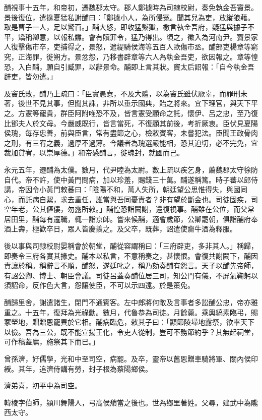 \begin{pinyinscope}
酺視事十五年，和帝初，遷魏郡太守。郡人鄭據時為司隸校尉，奏免執金吾竇景。景後復位，遣掾夏猛私謝酺曰：「鄭據小人，為所侵冤。聞其兒為吏，放縱狼藉。取是曹子一人，足以驚百。」酺大怒，即收猛繫獄，檄言執金吾府，疑猛與據子不平，矯稱卿意，以報私讎。會有贖罪令，猛乃得出。頃之，徵入為河南尹。竇景家人復擊傷市卒，吏捕得之，景怒，遣緹騎侯海等五百人歐傷市丞。酺部吏楊章等窮究，正海罪，徙朔方。景忿怨，乃移書辟章等六人為執金吾吏，欲因報之。章等惶恐，入白酺，願自引臧罪，以辭景命。酺即上言其狀。竇太后詔報：「自今執金吾辟吏，皆勿遣。」

及竇氏敗，酺乃上疏曰：「臣實愚惷，不及大體，以為竇氏雖伏厥辜，而罪刑未著，後世不見其事，但聞其誅，非所以垂示國典，貽之將來。宜下理官，與天下平之。方憲等寵貴，群臣阿附唯恐不及，皆言憲受顧命之託，懷伊、呂之忠，至乃復比鄧夫人於文母。今嚴威既行，皆言當死，不復顧其前後，考折厥衷。臣伏見夏陽侯瑰，每存忠善，前與臣言，常有盡節之心，檢敕賓客，未嘗犯法。臣聞王政骨肉之刑，有三宥之義，過厚不過薄。今議者為瑰選嚴能相，恐其迫切，必不完免，宜裁加貸宥，以崇厚德。」和帝感酺言，徙瑰封，就國而己。

永元五年，遷酺為太僕。數月，代尹睦為太尉。數上疏以疾乞身，薦魏郡太守徐防自代。帝不許，使中黃門問病，加以珍羞，賜錢三十萬。酺遂稱篤。時子蕃以郎侍講，帝因令小黃門敕蕃曰：「陰陽不和，萬人失所，朝廷望公思惟得失，與國同心，而託病自絜，求去重任，誰當與吾同憂責者？非有望於斷金也。司徒固疾，司空年老，公其傴僂，勿露所敕。」酺惶恐詣闕謝，還復視事。酺雖在公位，而父常居田里，酺每有遷職，輒一詣京師。嘗來候酺，適會歲節，公卿罷朝，俱詣酺府奉酒上壽，極歡卒日，眾人皆慶羨之。及父卒，既葬，詔遣使齎牛酒為釋服。

後以事與司隸校尉晏稱會於朝堂，酺從容謂稱曰：「三府辟吏，多非其人。」稱歸，即奏令三府各實其掾史。酺本以私言，不意稱奏之，甚懷恨。會復共謝闕下，酺因責讓於稱。稱辭言不順，酺怒，遂廷叱之，稱乃劾奏酺有怨言。天子以酺先帝師，有詔公卿、博士、朝臣會議。司徒呂蓋奏酺位居三司，知公門有儀，不屏氣鞠躬以須詔命，反作色大言，怨讓使臣，不可以示四遠。於是策免。

酺歸里舍，謝遣諸生，閉門不通賓客。左中郎將何敞及言事者多訟酺公忠，帝亦雅重之。十五年，復拜為光祿勳。數月，代魯恭為司徒。月餘薨。乘輿縞素臨弔，賜冢塋地，賵贈恩寵異於它相。酺病臨危，敕其子曰：「顯節陵埽地露祭，欲率天下以儉。吾為三公，既不能宣揚王化，令吏人從制，豈可不務節約乎？其無起祠堂，可作稿蓋廡，施祭其下而已。」

曾孫濟，好儒學，光和中至司空，病罷。及卒，靈帝以舊恩贈車騎將軍、關內侯印綬。其年，追濟侍講有勞，封子根為蔡陽鄉侯。

濟弟喜，初平中為司空。

韓棱字伯師，潁川舞陽人，弓高侯穨當之後也。世為鄉里著姓。父尋，建武中為隴西太守。


\end{pinyinscope}

